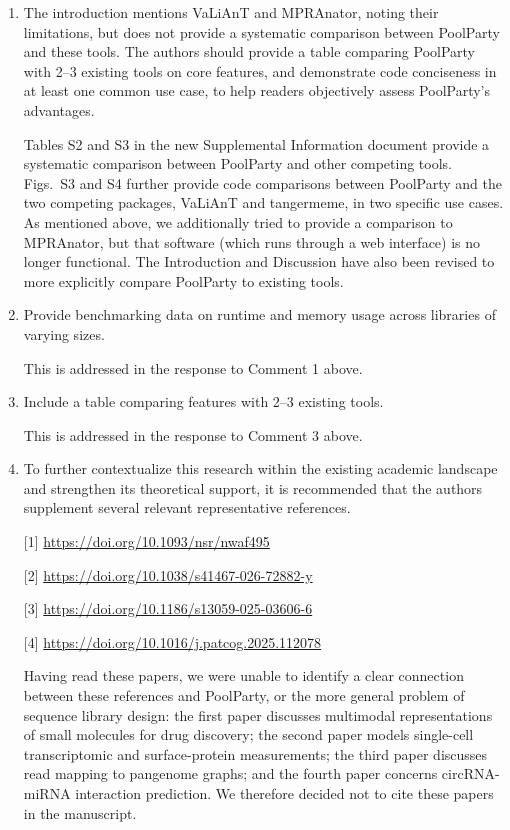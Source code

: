 \documentclass[11pt]{article}
\newenvironment{response}{\par\color{responseblue}}{\par}
\begin{document}
\begin{enumerate}
\item The introduction mentions VaLiAnT and MPRAnator, noting their limitations,
but does not provide a systematic comparison between PoolParty and these tools.
The authors should provide a table comparing PoolParty with 2--3 existing tools
on core features, and demonstrate code conciseness in at least one common use
case, to help readers objectively assess PoolParty's advantages.

\begin{response}
Tables S2 and S3 in the new Supplemental Information document provide a systematic comparison between PoolParty and other competing tools. Figs.~S3 and S4 further provide code comparisons between PoolParty and the two competing packages, VaLiAnT and tangermeme, in two specific use cases. As mentioned above, we additionally tried to provide a comparison to MPRAnator, but that software (which runs through a web interface) is no longer functional. The Introduction and Discussion have also been revised to more explicitly compare PoolParty to existing tools. 
\end{response}

\item Provide benchmarking data on runtime and memory usage across libraries of
varying sizes.

\begin{response}
This is addressed in the response to Comment 1 above. 
\end{response}

\item Include a table comparing features with 2--3 existing tools.

\begin{response}
This is addressed in the response to Comment 3 above. 
\end{response}

\item To further contextualize this research within the existing academic
landscape and strengthen its theoretical support, it is recommended that the
authors supplement several relevant representative references.

[1] \url{https://doi.org/10.1093/nsr/nwaf495}

[2] \url{https://doi.org/10.1038/s41467-026-72882-y}

[3] \url{https://doi.org/10.1186/s13059-025-03606-6}

[4] \url{https://doi.org/10.1016/j.patcog.2025.112078}

\begin{response}
Having read these papers, we were unable to identify a clear connection between these references and PoolParty, or the more general problem of sequence library design: the first paper discusses multimodal representations of small molecules for drug discovery; the second paper models single-cell transcriptomic and surface-protein measurements; the third paper discusses read mapping to pangenome graphs; and the fourth paper concerns circRNA-miRNA interaction prediction. We therefore decided not to cite these papers in the manuscript. 
\end{response}


\end{enumerate}
\end{document}
